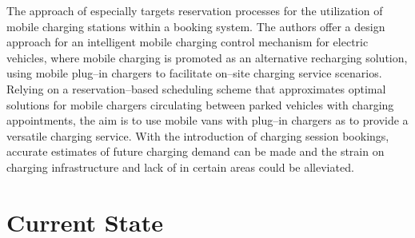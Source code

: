 The approach of \cite{zhang_mobile_2020} especially targets reservation processes for the utilization of mobile charging stations within a booking system.
The authors offer a design approach for an intelligent mobile charging control mechanism for electric vehicles, where mobile charging is promoted as an alternative recharging solution, using mobile plug--in chargers to facilitate on--site charging service scenarios.
Relying on a reservation--based scheduling scheme that approximates optimal solutions for mobile chargers circulating between parked vehicles with charging appointments, the aim is to use mobile vans with plug--in chargers as  to provide a versatile charging service.
With the introduction of charging session bookings, accurate estimates of future charging demand can be made and the strain on charging infrastructure and lack of  in certain areas could be alleviated.

\section{Current State}
\label{ch:Literature Review:sec:Current State}

